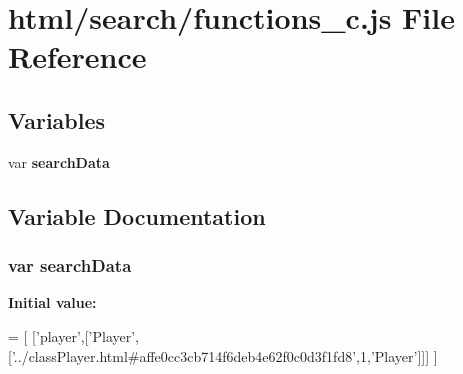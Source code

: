 \section{html/search/functions\-\_\-c.js File Reference}
\label{functions__c_8js}
\subsection*{Variables}
\begin{DoxyCompactItemize}
\item 
var {\bf search\-Data}
\end{DoxyCompactItemize}


\subsection{Variable Documentation}
\subsubsection[{search\-Data}]{\setlength{\rightskip}{0pt plus 5cm}var search\-Data}\label{functions__c_8js_ad01a7523f103d6242ef9b0451861231e}
{\bfseries Initial value\-:}
\begin{DoxyCode}
=
[
  [\textcolor{stringliteral}{'player'},[\textcolor{stringliteral}{'Player'},[\textcolor{stringliteral}{'../classPlayer.html#affe0cc3cb714f6deb4e62f0c0d3f1fd8'},1,\textcolor{stringliteral}{'Player'}]]]
]
\end{DoxyCode}
